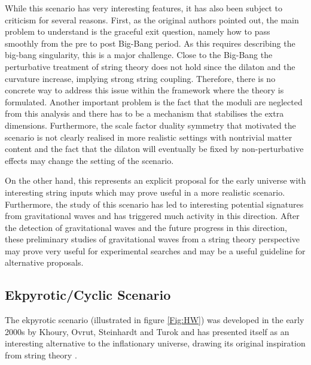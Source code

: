 While this scenario has very interesting features, it has also been subject to criticism for several reasons. First, as
 the original authors pointed out,
 the main problem to understand is the graceful exit question,
namely how to pass smoothly from the pre to post Big-Bang period. As this requires describing the big-bang singularity, this is a major challenge. 
Close to the Big-Bang the perturbative treatment of 
string theory does not hold since the dilaton and the curvature increase,
 implying strong string coupling. Therefore, there is no concrete way to
 address this issue within the framework where the theory is formulated. 
Another important
 problem is the fact that the moduli are neglected from this analysis and 
there has to be a mechanism that stabilises the extra dimensions. 
Furthermore, the scale factor duality symmetry that motivated the scenario is not
 clearly realised
in  more realistic settings with nontrivial matter content and the fact that the 
dilaton will eventually be fixed by non-perturbative effects may change the 
setting of the scenario. 

On the other hand, this represents an explicit proposal for the early universe with interesting string inputs which  may prove useful in a
more realistic scenario. Furthermore, the study of this scenario has led to interesting potential signatures from gravitational waves and has triggered
much activity in this direction. After the detection of gravitational waves and the future progress in this direction, these preliminary studies of gravitational waves
from a string theory perspective may prove very useful for experimental searches and may be a useful guideline for alternative proposals.

\subsection{Ekpyrotic/Cyclic Scenario}

The ekpyrotic scenario (illustrated in figure \ref{Fig:HW}) was developed in the early 2000s by Khoury, Ovrut, Steinhardt and Turok and has presented itself as an interesting alternative to the inflationary universe, drawing its original inspiration from string theory \cite{Khoury:2001wf,Khoury:2001bz,Steinhardt:2002ih, Lehners:2008vx}.

